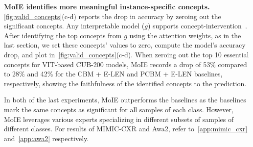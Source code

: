 \textbf{MoIE identifies more meaningful instance-specific concepts.} 
\cref{fig:valid_concepts}(c-d) reports the drop in accuracy by zeroing out the significant concepts.
Any interpretable model ($g$) supports concept-intervention~\cite{koh2020concept}. 
After identifying the top concepts from $g$ using the attention weights, as in the last section, we set these concepts' values to zero, compute the model's accuracy drop, and plot in~\cref{fig:valid_concepts}(c-d). When zeroing out the top 10 essential concepts for VIT-based CUB-200 models, MoIE records a drop of 53\% compared to 28\% and 42\% for the CBM + E-LEN and PCBM + E-LEN baselines, respectively, showing the faithfulness of the identified concepts to the prediction.

In both of the last experiments, MoIE outperforms the baselines as the baselines mark the same concepts as significant for all samples of each class. However,
MoIE leverages various experts specializing in different subsets of samples of different classes. 
For results of MIMIC-CXR and Awa2, refer to~\cref{app:mimic_cxr} and~\cref{app:awa2} respectively.



